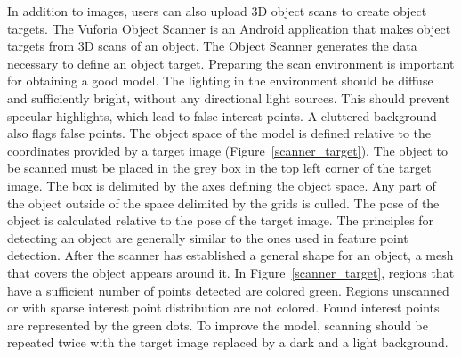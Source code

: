 In addition to images, users can also upload 3D object scans to create object targets. The Vuforia Object Scanner is an Android application that makes object targets from 3D scans of an object. The Object Scanner generates the data necessary to define an object target. Preparing the scan environment is important for obtaining a good model. The lighting in the environment should be diffuse and sufficiently bright, without any directional light sources. This should prevent specular highlights, which lead to false interest points. A cluttered background also flags false points. The object space of the model is defined relative to the coordinates provided by a target image (Figure~\ref{scanner_target}). The object to be scanned must be placed in the grey box in the top left corner of the target image. The box is delimited by the axes defining the object space. Any part of the object outside of the space delimited by the grids is culled. The pose of the object is calculated relative to the pose of the target image. The principles for detecting an object are generally similar to the ones used in feature point detection. After the scanner has established a general shape for an object, a mesh that covers the object appears around it. In Figure~\ref{scanner_target}, regions that have a sufficient number of points detected are colored green. Regions unscanned or with sparse interest point distribution are not colored. Found interest points are represented by the green dots. To improve the model, scanning should be repeated twice with the target image replaced by a dark and a light background.

\begin{figure}[!ht]
\end{figure}

\begin{figure}[!ht]
\end{figure}

